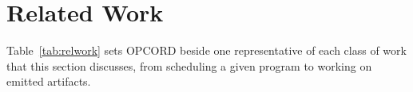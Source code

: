 \section{Related Work}
\label{sec:related}


Table~\ref{tab:relwork} sets OPCORD beside one representative of each class of work that this section discusses, from scheduling a given program to working on emitted artifacts.

